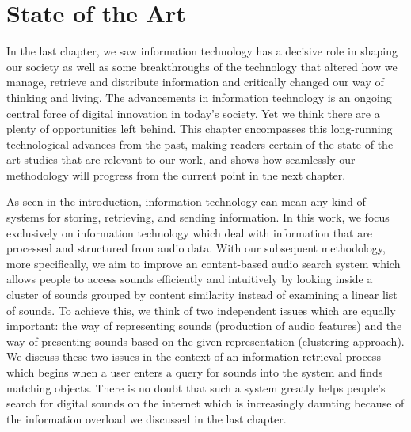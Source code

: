 \normallinespacing

\chapter{State of the Art}

In the last chapter, we saw information technology has a decisive role in shaping our society as well as some breakthroughs of the technology that altered how we manage, retrieve and distribute information and critically changed our way of thinking and living. The advancements in information technology is an ongoing central force of digital innovation in today's society. Yet we think there are a plenty of opportunities left behind. This chapter encompasses this long-running technological advances from the past, making readers certain of the state-of-the-art studies that are relevant to our work, and shows how seamlessly our methodology will progress from the current point in the next chapter. 

As seen in the introduction, information technology can mean any kind of systems for storing, retrieving, and sending information. In this work, we focus exclusively on information technology which deal with information that are processed and structured from audio data. 
With our subsequent methodology, more specifically, we aim to improve an content-based audio search system which allows people to access sounds efficiently and intuitively by looking inside a cluster of sounds grouped by content similarity instead of examining a linear list of sounds.
To achieve this, we think of two independent issues which are equally important: the way of representing sounds (production of audio features) and the way of presenting sounds based on the given representation (clustering approach). We discuss these two issues in the context of an information retrieval process which begins when a user enters a query for sounds into the system and finds matching objects. There is no doubt that such a system greatly helps people's search for digital sounds on the internet which is increasingly daunting because of the information overload we discussed in the last chapter.


